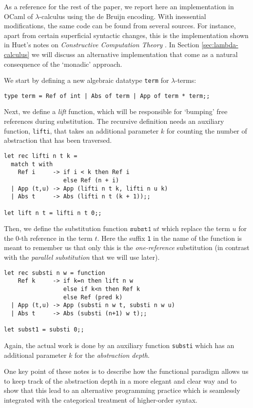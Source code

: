 \documentclass[a4paper,twoside,12pt]{article}
\theoremstyle{definition}
\theoremstyle{remark}
\theoremstyle{example}
\begin{document}
As a reference for the rest of the paper, we report here an
implementation in OCaml of $\lambda$-calculus using the de Bruijn
encoding.  With inessential modifications, the same code can be found
from several sources.  For instance, apart from certain superficial
syntactic changes, this is the implementation shown in Huet's notes on
\emph{Constructive Computation Theory} \cite[Section 1.4.2,
p.~15]{Huet-1992}.  In Section \ref{sec:lambda-calculus} we will
discuss an alternative implementation that come as a natural
consequence of the `monadic' approach.

We start by defining a new algebraic datatype \texttt{term} for
$\lambda$-terms:
\begin{verbatim}
type term = Ref of int | Abs of term | App of term * term;;
\end{verbatim}
Next, we define a \emph{lift} function, which will be responsible for
`bumping' free references during substitution.  The recursive
definition needs an auxiliary function, \texttt{lifti}, that takes an
additional parameter $k$ for counting the number of abstraction that
has been traversed.
\begin{verbatim}
let rec lifti n t k =
  match t with
    Ref i     -> if i < k then Ref i
                 else Ref (n + i)
  | App (t,u) -> App (lifti n t k, lifti n u k)
  | Abs t     -> Abs (lifti n t (k + 1));;

let lift n t = lifti n t 0;;
\end{verbatim}
Then, we define the substitution function $\mathtt{subst1}\ u t$ which
replace the term $u$ for the $0$-th reference in the term $t$.  Here
the suffix \texttt{1} in the name of the function is meant to remember
us that only this is the \emph{one-reference} substitution (in
contrast with the \emph{parallel substitution} that we will use
later).
\begin{verbatim}
let rec substi n w = function
    Ref k     -> if k=n then lift n w
                 else if k<n then Ref k
                 else Ref (pred k)
  | App (t,u) -> App (substi n w t, substi n w u)
  | Abs t     -> Abs (substi (n+1) w t);;

let subst1 = substi 0;;
\end{verbatim}
Again, the actual work is done by an auxiliary function
\texttt{substi} which has an additional parameter $k$ for
the \emph{abstraction depth}.

One key point of these notes is to describe how the functional
paradigm allows us to keep track of the abstraction depth in a more
elegant and clear way and to show that this lead to an alternative
programming practice which is seamlessly integrated with the
categorical treatment of higher-order syntax.
\end{document}
